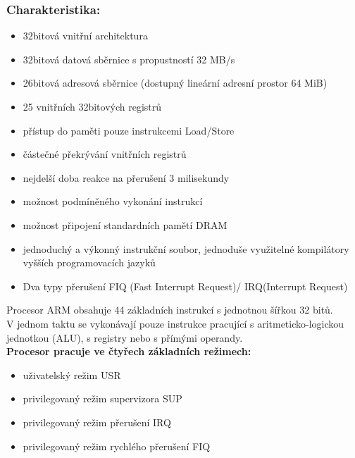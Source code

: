 \subsubsection{Charakteristika:}
\begin{itemize}
\item 32bitová vnitřní architektura
\item 32bitová datová sběrnice s propustností 32 MB/s
\item 26bitová adresová sběrnice (dostupný lineární adresní prostor
64 MiB)
\item 25 vnitřních 32bitových registrů
\item přístup do paměti pouze instrukcemi Load/Store
\item částečné překrývání vnitřních registrů
\item nejdelší doba reakce na přerušení 3 milisekundy
\item možnost podmíněného vykonání instrukcí
\item možnost připojení standardních pamětí DRAM
\item jednoduchý a výkonný instrukční soubor, jednoduše
využitelné kompilátory vyšších programovacích jazyků
\item Dva typy přerušení FIQ (Fast Interrupt Request)/ IRQ(Interrupt
Request)
\end{itemize}

Procesor ARM obsahuje 44 základních instrukcí s jednotnou šířkou 32 bitů.\\
V jednom taktu se vykonávají pouze instrukce pracující s aritmeticko-logickou jednotkou (ALU), s registry nebo s přímými operandy.\\
\textbf{Procesor pracuje ve čtyřech základních režimech:}
\begin{itemize}
\item uživatelský režim USR
\item privilegovaný režim supervizora SUP
\item privilegovaný režim přerušení IRQ
\item privilegovaný režim rychlého přerušení FIQ
\end{itemize}

